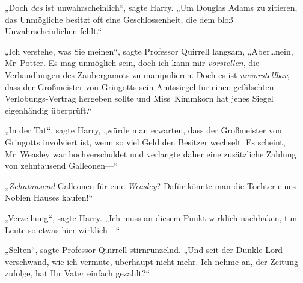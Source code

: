 „Doch \emph{das} ist unwahrscheinlich“, sagte Harry. „Um Douglas Adams zu zitieren, das Unmögliche besitzt oft eine Geschlossenheit, die dem bloß Unwahrscheinlichen fehlt.“

„Ich verstehe, was Sie meinen“, sagte Professor Quirrell langsam, „Aber…nein, Mr~Potter. Es mag unmöglich sein, doch ich kann mir \emph{vorstellen}, die Verhandlungen des Zaubergamots zu manipulieren. Doch es ist \emph{unvorstellbar}, dass der Großmeister von Gringotts sein Amtssiegel für einen gefälschten Verlobungs-Vertrag hergeben sollte und Miss~Kimmkorn hat jenes Siegel eigenhändig überprüft.“

„In der Tat“, sagte Harry, „würde man erwarten, dass der Großmeister von Gringotts involviert ist, wenn so viel Geld den Besitzer wechselt. Es scheint, Mr~Weasley war hochverschuldet und verlangte daher eine zusätzliche Zahlung von zehntausend Galleonen—“

„\emph{Zehntausend} Galleonen für eine \emph{Weasley}? Dafür könnte man die Tochter eines Noblen Hauses kaufen!“

„Verzeihung“, sagte Harry. „Ich muss an diesem Punkt wirklich nachhaken, tun Leute so etwas hier wirklich—“

„Selten“, sagte Professor Quirrell stirnrunzelnd. „Und seit der Dunkle Lord verschwand, wie ich vermute, überhaupt nicht mehr. Ich nehme an, der Zeitung zufolge, hat Ihr Vater einfach gezahlt?“

